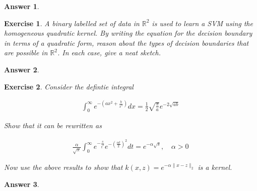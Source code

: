 \documentclass[12pt]{article}
\theoremstyle{colon}
\newtheorem{exercise}{Exercise}
\newtheorem*{answer}{Answer}
\begin{document}
\begin{answer}

\end{answer}

\clearpage

\begin{exercise}
  A binary labelled set of data in $\mathbb{R}^2$ is used to learn a SVM using the homogeneous quadratic kernel. By writing the equation for the decision boundary in terms of a quadratic form, reason about the types of decision boundaries that are possible in $\mathbb{R}^2$. In each case, give a neat sketch.
\end{exercise}

\begin{answer}

\end{answer}

\clearpage

\begin{exercise}
  Consider the defintie integral

  \begin{gather*}
    \int_0^\infty e^{-(ax^2 + \frac{b}{x^2})} dx = \frac{1}{2} \sqrt{\frac{\pi}{a}} e^{-2 \sqrt{ab}}
  \end{gather*}

  Show that it can be rewritten as

  \begin{gather*}
    \frac{\alpha}{\sqrt{\pi}} \int_0^\infty e^{-\frac{s}{t^2}} e^{-(\frac{\alpha t}{2})^2} dt = e^{-\alpha \sqrt{s}}, \quad \alpha > 0
  \end{gather*}

  Now use the above results to show that $k(x,z) = e^{-\alpha \lVert x - z \rVert_2}$ is a kernel.
\end{exercise}

\begin{answer}

\end{answer}

\clearpage
\end{document}
